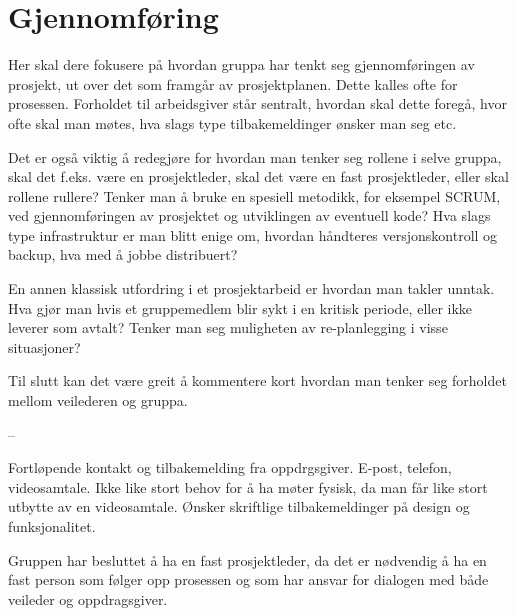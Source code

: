\documentclass[11pt,a4paper]{report}
\begin{document}
\section*{Gjennomføring}

Her skal dere  fokusere på hvordan gruppa har tenkt seg gjennomføringen av prosjekt, ut over det som framgår av prosjektplanen. Dette kalles ofte for prosessen. Forholdet til arbeidsgiver står sentralt, hvordan skal dette foregå, hvor ofte skal man møtes, hva slags type tilbakemeldinger ønsker man seg etc.

Det er også viktig å redegjøre for hvordan man tenker seg rollene i selve gruppa, skal det f.eks. være en prosjektleder, skal det være en fast prosjektleder, eller skal rollene rullere? Tenker man å bruke en spesiell metodikk, for eksempel SCRUM, ved gjennomføringen av prosjektet og utviklingen av eventuell kode? Hva slags type infrastruktur er man blitt enige om, hvordan håndteres versjonskontroll og backup, hva med å jobbe distribuert?

En annen klassisk utfordring i et prosjektarbeid er hvordan man takler unntak. Hva gjør man hvis et gruppemedlem blir sykt i en kritisk periode, eller ikke leverer som avtalt? Tenker man seg muligheten av re-planlegging i visse situasjoner?

Til slutt kan det være greit å kommentere kort hvordan man tenker seg forholdet mellom veilederen og gruppa. 

--

Fortløpende kontakt og tilbakemelding fra oppdrgsgiver. E-post, telefon, videosamtale. Ikke like stort behov for å ha møter fysisk, da man får like stort utbytte av en videosamtale. Ønsker skriftlige tilbakemeldinger på design og funksjonalitet. 

Gruppen har besluttet å ha en fast prosjektleder, da det er nødvendig å ha en fast person som følger opp prosessen og som har ansvar for dialogen med både veileder og oppdragsgiver.
\end{document}
